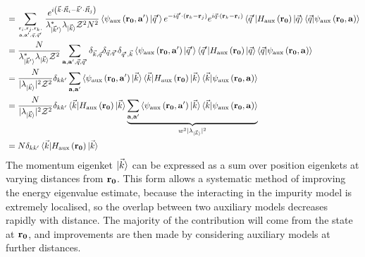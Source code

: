 \documentclass[reprint,hidelinks]{revtex4-2}
\begin{document}
\begin{widetext}
\begin{equation}
\begin{aligned}
								   &= \sum_{{\bf r}_i, {\bf r}_j, {\bf r}_k, \atop{{\bf a}, {\bf a}^\prime, \vec q, \vec q^\prime}}\frac{e^{i\left(\vec{k}\cdot\vec{R}_i - \vec{k}^\prime\cdot\vec{R}_j\right)}}{\lambda^*_{\ket{\vec k^\prime}} \lambda_{\ket{\vec k}} \mathcal{Z}^2 N^2} \braket{\psi_\text{aux}\left({\bf r_0}, {\bf a}^\prime\right)| \vec q^\prime} e^{-i \vec q^\prime \cdot \left({\bf r}_k - {\bf r}_j\right) } e^{i \vec q \cdot \left({\bf r}_k - {\bf r}_i\right)} \braket{\vec q^\prime | H_\text{aux}\left({\bf r_0}\right) | \vec q}  \braket{\vec q | \psi_\text{aux}\left({\bf r_0}, {\bf a}\right)}\\
								   &= \frac{N}{\lambda^*_{\ket{\vec k^\prime}} \lambda_{\ket{\vec k}} \mathcal{Z}^2}\sum_{{\bf a}, {\bf a}^\prime, \vec q, \vec q^\prime} \delta_{\vec k, \vec q} \delta_{\vec q,\vec q^\prime} \delta_{\vec q^\prime,\vec k} \braket{\psi_\text{aux}\left({\bf r_0}, {\bf a}^\prime\right)| \vec q^\prime} \braket{\vec q^\prime | H_\text{aux}\left({\bf r_0}\right) | \vec q}  \braket{\vec q | \psi_\text{aux}\left({\bf r_0}, {\bf a}\right)}\\
								   &= \frac{N}{|\lambda_{\ket{\vec k}}|^2 \mathcal{Z}^2}\delta_{kk^\prime}\sum_{{\bf a}, {\bf a}^\prime} \braket{\psi_\text{aux}\left({\bf r_0}, {\bf a}^\prime\right)| \vec k} \braket{\vec k | H_\text{aux}\left({\bf r_0}\right) | \vec k}  \braket{\vec k | \psi_\text{aux}\left({\bf r_0}, {\bf a}\right)}\\
								   &= \frac{N}{|\lambda_{\ket{\vec k}}|^2 \mathcal{Z}^2}\delta_{kk^\prime}\braket{\vec k | H_\text{aux}\left({\bf r_0}\right) | \vec k} \underbrace{\sum_{{\bf a}, {\bf a}^\prime} \braket{\psi_\text{aux}\left({\bf r_0}, {\bf a}^\prime\right)| \vec k} \braket{\vec k | \psi_\text{aux}\left({\bf r_0}, {\bf a}\right)}}_{w^2 |\lambda_{\ket{\vec k}}|^2}\\
	&= N\delta_{kk^\prime}\braket{\vec k | H_\text{aux}\left({\bf r_0}\right) | \vec k}
\end{aligned}\end{equation}
The momentum eigenket \(\ket{\vec k}\) can be expressed as a sum over position eigenkets at varying distances from \({\bf r_0}\). This form allows a systematic method of improving the energy eigenvalue estimate, because the interacting in the impurity model is extremely localised, so the overlap between two auxiliary models decreases rapidly with distance. The majority of the contribution will come from the state at \({\bf r_0}\), and improvements are then made by considering auxiliary models at further distances. 
\end{widetext}

\end{document}
